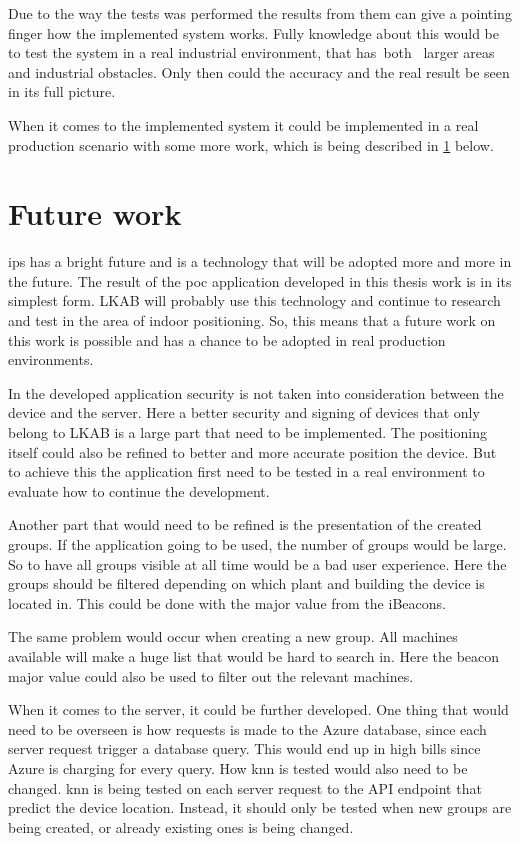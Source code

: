 Due to the way the tests was performed the results from them can give a pointing finger how the implemented system works.
Fully knowledge about this would be to test the system in a real industrial environment, that has both  larger areas and industrial obstacles.
Only then could the accuracy and the real result be seen in its full picture.

\bigskip

When it comes to the implemented system it could be implemented in a real production scenario with some more work, which is being described in \cref{sec:conclusionFutureWork} below.


\section{Future work}\label{sec:conclusionFutureWork}
\Acrlong{ips} has a bright future and is a technology that will be adopted more and more in the future.
The result of the \acrlong{poc} application developed in this thesis work is in its simplest form.
LKAB will probably use this technology and continue to research and test in the area of indoor positioning.
So, this means that a future work on this work is possible and has a chance to be adopted in real production environments.

\bigskip

In the developed application security is not taken into consideration between the device and the server.
Here a better security and signing of devices that only belong to LKAB is a large part that need to be implemented.
The positioning itself could also be refined to better and more accurate position the device. 
But to achieve this the application first need to be tested in a real environment to evaluate how to continue the development.

\bigskip

Another part that would need to be refined is the presentation of the created groups.
If the application going to be used, the number of groups would be large.
So to have all groups visible at all time would be a bad user experience.
Here the groups should be filtered depending on which plant and building the device is located in.
This could be done with the major value from the iBeacons.

\bigskip

The same problem would occur when creating a new group.
All machines available will make a huge list that would be hard to search in.
Here the beacon major value could also be used to filter out the relevant machines.

\bigskip

When it comes to the server, it could be further developed.
One thing that would need to be overseen is how requests is made to the Azure database, since each server request trigger a database query.
This would end up in high bills since Azure is charging for every query.
How \acrfull{knn} is tested would also need to be changed.
\acrshort{knn} is being tested on each server request to the API endpoint that predict the device location.
Instead, it should only be tested when new groups are being created, or already existing ones is being changed.

